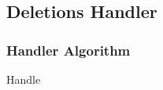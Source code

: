 \documentclass[../../Algorithms.tex]{subfiles}
\begin{document}
    \subsection{Deletions Handler}

    \subsubsection{Handler Algorithm}

    \begin{algorithm}[H]
        \caption{Handle}

    \end{algorithm}
\end{document}

